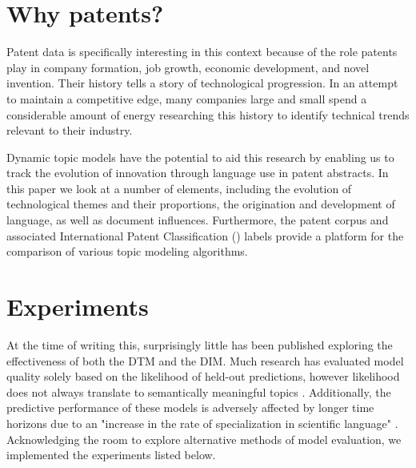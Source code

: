 \section{Why patents?}
Patent data is specifically interesting in this context because of the role patents play in company formation, job growth, economic development, and novel invention. Their history tells a story of technological progression. In an attempt to maintain a competitive edge, many companies large and small spend a considerable amount of energy researching this history to identify technical trends relevant to their industry. 

Dynamic topic models have the potential to aid this research by enabling us to track the evolution of innovation through language use in patent abstracts. In this paper we look at a number of elements, including the evolution of technological themes and their proportions, the origination and development of language, as well as document influences. Furthermore, the patent corpus and associated International Patent Classification () labels provide a platform for the comparison of various topic modeling algorithms.


\section{Experiments}

At the time of writing this, surprisingly little has been published exploring the effectiveness of both the DTM and the DIM. Much research has evaluated model quality solely based on the likelihood of held-out predictions, however likelihood does not always translate to semantically meaningful topics \parencite{Chang:Boyd-Graber:Wang:Gerrish:Blei-2009}. Additionally, the predictive performance of these models is adversely affected by longer time horizons due to an "increase in the rate of specialization in scientific language" \parencite{Blei:2006:DTM:1143844.1143859}. Acknowledging the room to explore alternative methods of model evaluation, we implemented the experiments listed below. 

